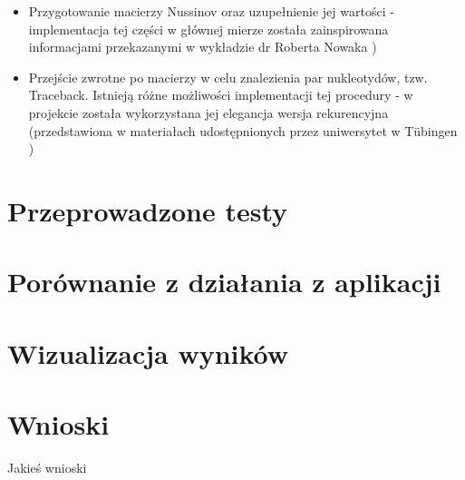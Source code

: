 \documentclass[paper=a4, fontsize=11pt]{scrartcl} %
\numberwithin{equation}{section} %
\numberwithin{figure}{section} %
\numberwithin{table}{section} %
\begin{document}
\begin{itemize}

	\item Przygotowanie macierzy Nussinov oraz uzupełnienie jej wartości - implementacja tej części w głównej mierze została zainspirowana informacjami przekazanymi w wykładzie dr Roberta Nowaka \cite{bib:slajdyNowak})
	\item Przejście zwrotne po macierzy w celu znalezienia par nukleotydów, tzw. Traceback. Istnieją różne możliwości implementacji tej procedury - w projekcie została wykorzystana jej elegancja wersja rekurencyjna (przedstawiona w materiałach udostępnionych przez uniwersytet w Tübingen \cite{bib:slajdyTubigen})
	
\end{itemize}


\section{Przeprowadzone testy}

% 


\section{Porównanie z działania z aplikacji}


 

\section{Wizualizacja wyników}

\section{Wnioski}

Jakieś wnioski

\renewcommand{\refname}{\normalfont\selectfont\normalsize Literatura i źródła} 



\end{document}
